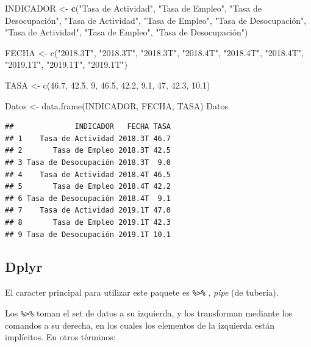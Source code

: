 \documentclass[]{book}
\newenvironment{Shaded}{\begin{snugshade}}{\end{snugshade}}
\newcommand{\FloatTok}[1]{\textcolor[rgb]{0.00,0.00,0.81}{#1}}
\newcommand{\KeywordTok}[1]{\textcolor[rgb]{0.13,0.29,0.53}{\textbf{#1}}}
\newcommand{\NormalTok}[1]{#1}
\newcommand{\StringTok}[1]{\textcolor[rgb]{0.31,0.60,0.02}{#1}}
\begin{document}
\begin{Shaded}
\begin{Highlighting}[]
\NormalTok{INDICADOR <-}\StringTok{ }\KeywordTok{c}\NormalTok{(}\StringTok{"Tasa de Actividad"}\NormalTok{, }\StringTok{"Tasa de Empleo"}\NormalTok{, }\StringTok{"Tasa de Desocupación",}
\StringTok{               "}\NormalTok{Tasa de Actividad}\StringTok{", "}\NormalTok{Tasa de Empleo}\StringTok{", "}\NormalTok{Tasa de Desocupación",}
               \StringTok{"Tasa de Actividad"}\NormalTok{, }\StringTok{"Tasa de Empleo"}\NormalTok{, }\StringTok{"Tasa de Desocupación")}

\StringTok{FECHA <-     c("}\FloatTok{2018.3}\NormalTok{T}\StringTok{", "}\FloatTok{2018.3}\NormalTok{T}\StringTok{", "}\FloatTok{2018.3}\NormalTok{T}\StringTok{",}
\StringTok{               "}\FloatTok{2018.4}\NormalTok{T}\StringTok{", "}\FloatTok{2018.4}\NormalTok{T}\StringTok{", "}\FloatTok{2018.4}\NormalTok{T}\StringTok{",}
\StringTok{               "}\FloatTok{2019.1}\NormalTok{T}\StringTok{", "}\FloatTok{2019.1}\NormalTok{T}\StringTok{", "}\FloatTok{2019.1}\NormalTok{T}\StringTok{")}

\StringTok{TASA <-      c(46.7, 42.5, 9,}
\StringTok{               46.5, 42.2, 9.1, }
\StringTok{               47,   42.3, 10.1)}

\StringTok{Datos <- data.frame(INDICADOR, FECHA, TASA)}
\StringTok{Datos}
\end{Highlighting}
\end{Shaded}

\begin{verbatim}
##              INDICADOR   FECHA TASA
## 1    Tasa de Actividad 2018.3T 46.7
## 2       Tasa de Empleo 2018.3T 42.5
## 3 Tasa de Desocupación 2018.3T  9.0
## 4    Tasa de Actividad 2018.4T 46.5
## 5       Tasa de Empleo 2018.4T 42.2
## 6 Tasa de Desocupación 2018.4T  9.1
## 7    Tasa de Actividad 2019.1T 47.0
## 8       Tasa de Empleo 2019.1T 42.3
## 9 Tasa de Desocupación 2019.1T 10.1
\end{verbatim}

\hypertarget{dplyr}{%
\subsection{Dplyr}\label{dplyr}}

El caracter principal para utilizar este paquete es \texttt{\%\textgreater{}\%} , \emph{pipe} (de tubería).

Los \texttt{\%\textgreater{}\%} toman el set de datos a su izquierda, y los transforman mediante los comandos a su derecha, en los cuales los elementos de la izquierda están implícitos. En otros términos:
\end{document}
